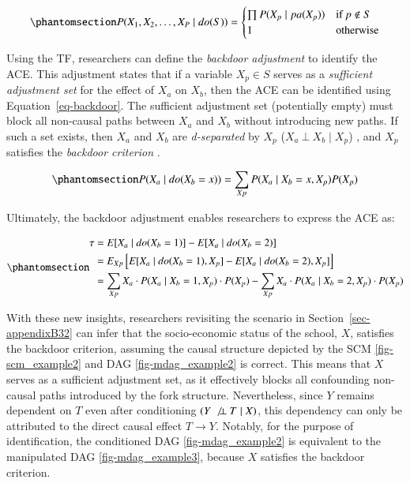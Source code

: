 \documentclass[
  authoryear,
  review,
  1p]{elsarticle}
\begin{document}
\begin{equation}\protect\phantomsection\label{eq-trunc_factor}{
P(X_{1}, X_{2}, \dots, X_{P} \mid do(S)) =
\begin{cases}
  \prod P(X_{p} \mid pa(X_{p}) ) & \text{if} \: p \not\in S \\
  1 \quad & \text{otherwise}
\end{cases}
}\end{equation}

Using the TF, researchers can define the \emph{backdoor adjustment} to
identify the ACE. This adjustment states that if a variable
\(X_{p} \in S\) serves as a \emph{sufficient adjustment set} for the
effect of \(X_{a}\) on \(X_{b}\), then the ACE can be identified using
Equation~\ref{eq-backdoor}. The sufficient adjustment set (potentially
empty) must block all non-causal paths between \(X_{a}\) and \(X_{b}\)
without introducing new paths. If such a set exists, then \(X_{a}\) and
\(X_{b}\) are \emph{d-separated} by \(X_{p}\)
(\(X_{a} \:\bot\:X_{b} \mid X_{p}\)) \citep{Pearl_2009}, and \(X_{p}\)
satisfies the \emph{backdoor criterion} \citep[p.~37]{Neal_2020}.

\begin{equation}\protect\phantomsection\label{eq-backdoor}{
P(X_{a} \mid do(X_{b}=x)) = \sum_{Xp} P(X_{a} \mid X_{b}=x, X_{p}) P(X_{p})
}\end{equation}

Ultimately, the backdoor adjustment enables researchers to express the
ACE as:

\begin{equation}\protect\phantomsection\label{eq-backdoor_adjustment}{
\begin{aligned}
\tau & = E[X_{a} \mid do(X_{b}=1)]- E[X_{a} \mid do(X_{b}=2)] \\
  & = E_{Xp}\left[ E[X_{a} \mid do(X_{b}=1), X_{p}]- E[X_{a} \mid do(X_{b}=2), X_{p}] \right] \\
  & = \sum_{Xp} X_{a} \cdot P(X_{a} \mid X_{b}=1, X_{p}) \cdot P(X_{p}) - \sum_{Xp} X_{a} \cdot P(X_{a} \mid X_{b}=2, X_{p}) \cdot P(X_{p})
\end{aligned}
}\end{equation}

With these new insights, researchers revisiting the scenario in
Section~\ref{sec-appendixB32} can infer that the socio-economic status
of the school, \(X\), satisfies the backdoor criterion, assuming the
causal structure depicted by the SCM \ref{fig-scm_example2} and DAG
\ref{fig-mdag_example2} is correct. This means that \(X\) serves as a
sufficient adjustment set, as it effectively blocks all confounding
non-causal paths introduced by the fork structure. Nevertheless, since
\(Y\) remains dependent on \(T\) even after conditioning
\((Y \:\not\bot\:T \mid X)\), this dependency can only be attributed to
the direct causal effect \(T \rightarrow Y\). Notably, for the purpose
of identification, the conditioned DAG \ref{fig-mdag_example2} is
equivalent to the manipulated DAG \ref{fig-mdag_example3}, because \(X\)
satisfies the backdoor criterion.
\end{document}
